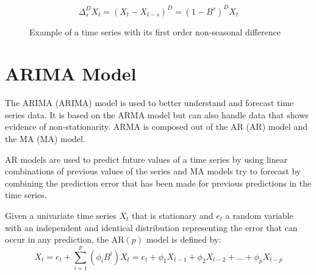 \begin{equation}\label{eq:seasonal_first_difference}
	\Delta_s^D X_t = (X_t - X_{t-s})^D = (1-B^s)^DX_t
\end{equation}

\begin{figure}[ht]
	\centering
	\caption{Example of a time series with its first order non-seasonal difference}
  \label{fig:example_seasonal_diff}
\end{figure}



\section{ARIMA Model}
The \acs{ARIMA} (\acs{ARIMA}) model is used to better understand and forecast time series data. It is based on the \acs{ARMA} model but can also handle data that shows evidence of non-stationarity.  
\acs{ARMA} is composed out of the \acl{AR} (\acs{AR}) model and the \acl{MA} (\acs{MA}) model.

\acl{AR} models are used to predict future values of a time series by using linear combinations of previous values of the series and \acl{MA} models try to forecast by combining the prediction error that has been made for previous predictions in the time series.

Given a univariate time series \(X_t\) that is stationary and \(e_t\) a random variable with an independent and identical distribution representing the error that can occur in any prediction, the \acs{AR}\((p)\) model is defined by:
\begin{equation}\label{eq:AR_p}
	X_t = e_t + \displaystyle\sum_{i=1}^{p} (\phi_i B^i) X_t = e_t + \phi_1 X_{t-1}+ \phi_2 X_{t-2}+ ... + \phi_p X_{t-p}
\end{equation}

